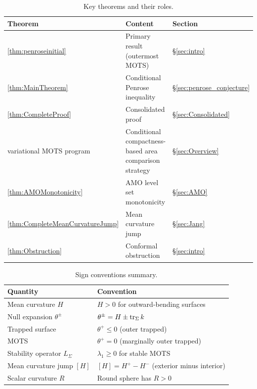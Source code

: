 \begin{table}[ht]
\centering
\caption{Key theorems and their roles.}
\small
\begin{tabular}{@{}lll@{}}
\hline
\textbf{Theorem} & \textbf{Content} & \textbf{Section} \\
\hline
\ref{thm:penroseinitial} & Primary result (outermost MOTS) & \S\ref{sec:intro} \\
\ref{thm:MainTheorem} & Conditional Penrose inequality & \S\ref{sec:penrose_conjecture} \\
\ref{thm:CompleteProof} & Consolidated proof & \S\ref{sec:Consolidated} \\
variational MOTS program & Conditional compactness-based area comparison strategy & \S\ref{sec:Overview} \\
\ref{thm:AMOMonotonicity} & AMO level set monotonicity & \S\ref{sec:AMO} \\
\ref{thm:CompleteMeanCurvatureJump} & Mean curvature jump & \S\ref{sec:Jang} \\
\ref{thm:Obstruction} & Conformal obstruction & \S\ref{sec:intro} \\
\hline
\end{tabular}
\end{table}

\begin{table}[ht]
\centering
\caption{Sign conventions summary.}
\begin{tabular}{l l}
\hline
\textbf{Quantity} & \textbf{Convention} \\
\hline
Mean curvature $H$ & $H > 0$ for outward-bending surfaces \\
Null expansion $\theta^\pm$ & $\theta^\pm = H \pm \operatorname{tr}_\Sigma k$ \\
Trapped surface & $\theta^+ \le 0$ (outer trapped) \\
MOTS & $\theta^+ = 0$ (marginally outer trapped) \\
Stability operator $L_\Sigma$ & $\lambda_1 \ge 0$ for stable MOTS \\
Mean curvature jump $[H]$ & $[H] = H^+ - H^-$ (exterior minus interior) \\
Scalar curvature $R$ & Round sphere has $R > 0$ \\
\hline
\end{tabular}
\end{table}


